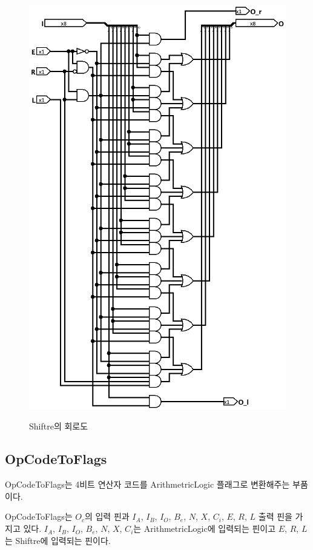 \documentclass{article}
\begin{document}
\begin{figure}[p]
    \centering
    \includegraphics[scale=0.5]{Shiftre} \\
    \caption{Shiftre의 회로도}
    \label{fig:shr}
\end{figure}

\pagebreak

\subsection{OpCodeToFlags}

OpCodeToFlags는 4비트 연산자 코드를 ArithmetricLogic 플래그로 변환해주는
부품이다.

OpCodeToFlags는 $O_c$의 입력 핀과
$I_A$, $I_B$, $I_O$, $B_e$, $N$, $X$, $C_i$, $E$, $R$, $L$ 출력 핀을 가지고 있다.
$I_A$, $I_B$, $I_O$, $B_e$, $N$, $X$, $C_i$는 ArithmetricLogic에 입력되는 핀이고
$E$, $R$, $L$는 Shiftre에 입력되는 핀이다.
\end{document}
